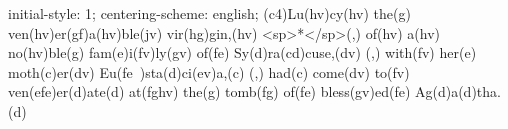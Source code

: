 initial-style: 1;
centering-scheme: english;
(c4)Lu(hv)cy(hv) the(g) ven(hv)er(gf)a(hv)ble(jv) vir(hg)gin,(hv) <sp>*</sp>(,) of(hv) a(hv) no(hv)ble(g) fam(e)i(fv)ly(gv) of(fe) Sy(d)ra(cd)cuse,(dv) (,) with(fv) her(e) moth(c)er(dv) Eu(fe~)sta(d)ci(ev)a,(c) (,) had(c) come(dv) to(fv) ven(efe)er(d)ate(d) at(fghv) the(g) tomb(fg) of(fe) bless(gv)ed(fe) Ag(d)a(d)tha.(d)
